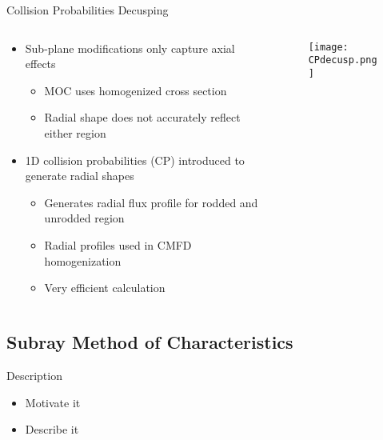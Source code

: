 
\begin{frame}[t]{Collision Probabilities Decusping}
    
    \begin{columns}
        \begin{column}{0.45\textwidth}
            \begin{itemize}
                \item Sub-plane modifications only capture axial effects
                \begin{itemize}
                    \item MOC uses homogenized cross section
                    \item Radial shape does not accurately reflect either region
                \end{itemize}
                \item 1D collision probabilities (CP) introduced to generate radial 
                shapes
                \begin{itemize}
                    \item Generates radial flux profile for rodded and unrodded region
                    \item Radial profiles used in CMFD homogenization
                    \item Very efficient calculation
                \end{itemize}
            \end{itemize}
        \end{column}
        \begin{column}{0.55\textwidth}
            \begin{figure}[h]
                \centering
                \texttt{[image: CPdecusp.png]}
            \end{figure}
        \end{column}
    \end{columns}
    
\end{frame}


\subsection{Subray Method of Characteristics}
\begin{frame}[t]{Description}

\begin{itemize}
    \item Motivate it
    \item Describe it
\end{itemize}

\end{frame}

